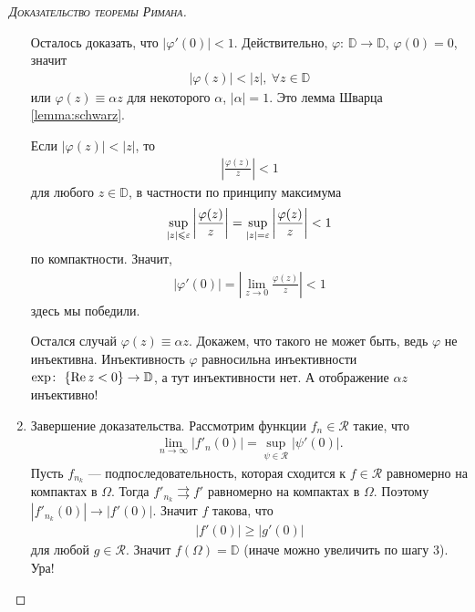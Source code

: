 \documentclass[../complex-analysis.tex]{subfiles}
\begin{document}
\begin{proof}[\normalfont\textsc{Доказательство теоремы Римана}]
\begin{enumerate}
   Осталось доказать, что $ \left| \varphi'(0) \right| < 1 $. Действительно, $ \varphi\colon\,\mathbb D \to \mathbb D $, $ \varphi(0) = 0 $, значит
   \begin{align*}
    \left| \varphi(z) \right| < \left| z \right|, \ \forall z \in \mathbb D
   \end{align*} или $ \varphi(z) \equiv \alpha z $ для некоторого $ \alpha $, $ \left| \alpha \right| = 1 $. Это лемма Шварца \eqref{lemma:schwarz}.

   Если $ \left| \varphi(z) \right| < \left| z \right| $, то
   \begin{align*}
    \left| \frac{\varphi(z)}{z} \right| < 1
   \end{align*} для любого $ z \in \mathbb D $, в частности по принципу максимума
   \begin{align*}
    \sup_{\left| z \right| \leqslant \varepsilon} \left| \frac{\varphi(z)}{z} \right| = \sup_{\left| z \right| = \varepsilon} \left| \frac{\varphi(z)}{z} \right| < 1
   \end{align*} по компактности. Значит,
   \begin{align*}
    |\varphi'(0)| = \left| \lim_{z \to 0} \frac{\varphi(z)}{z} \right| < 1
   \end{align*} здесь мы победили.

   Остался случай $ \varphi(z) \equiv \alpha z $. Докажем, что такого не может быть, ведь $ \varphi $ не инъективна. Инъективность $ \varphi $ равносильна инъективности $ \exp \colon\, \left\{ \operatorname{Re} z < 0 \right\} \to \mathbb D $, а тут инъективности нет. А отображение $ \alpha z $ инъективно!

  \item Завершение доказательства. Рассмотрим функции $ f_n \in \mathcal R $ такие, что
   \begin{align*}
    \lim_{n \to \infty} \left| f'_n(0) \right| = \sup_{\psi \in \mathcal R} \left| \psi'(0) \right|.
   \end{align*} Пусть $ f_{n_k} $ --- подпоследовательность, которая сходится к $ f \in \mathcal R $ равномерно на компактах в $ \Omega $. Тогда $ f'_{n_k} \rightrightarrows f' $ равномерно на компактах в $ \Omega $. Поэтому $ \left| f'_{n_k}(0) \right| \to \left| f'(0) \right| $. Значит $ f $ такова, что
   \begin{align*}
    \left| f'(0) \right| \geqslant \left| g'(0) \right|
   \end{align*} для любой $ g \in \mathcal R $. Значит $ f(\Omega) = \mathbb D $ (иначе можно увеличить по шагу 3). Ура!
 \end{enumerate}
\end{proof}
\end{document}
